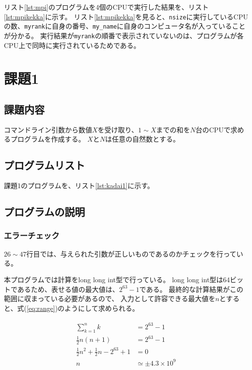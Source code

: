 \documentclass[a4j,titlepage]{jsarticle}
\begin{document}


リスト\ref{lst:mpi}のプログラムを4個のCPUで実行した結果を、リスト\ref{lst:mpikekka}に示す。
リスト\ref{lst:mpikekka}を見ると、\texttt{nsize}に実行しているCPUの数、\texttt{myrank}に自身の番号、\texttt{my\_name}に自身のコンピュータ名が入っていることが分かる。
実行結果が\texttt{myrank}の順番で表示されていないのは、プログラムが各CPU上で同時に実行されているためである。




\section{課題1}
\subsection{課題内容}
コマンドライン引数から数値$X$を受け取り、$1 \sim X$までの和を$N$台のCPUで求めるプログラムを作成する。
$X$と$N$は任意の自然数とする。

\subsection{プログラムリスト}
課題1のプログラムを、リスト\ref{lst:kadai1}に示す。



\subsection{プログラムの説明}
\subsubsection{エラーチェック}
$26 \sim 47$行目では、与えられた引数が正しいものであるのかチェックを行っている。

本プログラムでは計算をlong long int型で行っている。
long long int型は64ビットであるため、表せる値の最大値は、$2^{63} - 1$である。
最終的な計算結果がこの範囲に収まっている必要があるので、
入力として許容できる最大値を$n$とすると、式(\ref{eq:range})のようにして求められる。

\begin{align}
  \begin{aligned}
    \sum^{n}_{k = 1} k &= 2^{63} - 1 \\
    \frac{1}{2} n (n + 1) &= 2^{63} - 1 \\
    \frac{1}{2} n^2 + \frac{1}{2} n - 2^{63} + 1 &= 0 \\
    n &\simeq \pm 4.3 \times 10^9
    \label{eq:range}
  \end{aligned}
\end{align}
\end{document}
